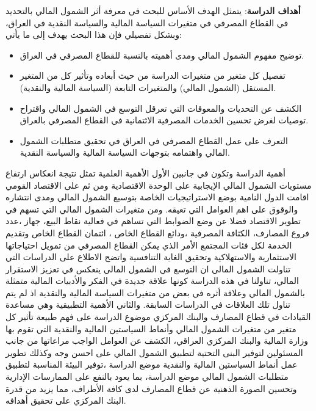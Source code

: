 \documentclass[10pt,a4paper]{report}
\begin{document}
\begin{doublespacing}
\textbf{أهداف الدراسة}: يتمثل الهدف الأساس للبحث في معرفة أثر الشمول المالي بالتحديد في القطاع المصرفي في متغيرات السياسة المالية والسياسة النقدية في العراق، وبشكل تفصيلي فإن هذا البحث يهدف إلى ما يأتي:
\begin{itemize}
	\item توضيح مفهوم الشمول المالي ومدى أهميته بالنسبة للقطاع المصرفي في العراق.
	\item تفصيل كل متغير من متغيرات الدراسة من حيث أبعاده وتأثير كل من المتغير المستقل (الشمول المالي) والمتغيرات التابعة (السياسة المالية والنقدية).
	\item الكشف عن التحديات والمعوقات التي تعرقل التوسع في الشمول المالي واقتراح توصيات لغرض تحسين الخدمات المصرفية الائتمانية في القطاع المصرفي بالعراق.
	\item التعرف على عمل القطاع المصرفي في العراق في تحقيق متطلبات الشمول المالي واهتمامه بتوجهات السياسة المالية والسياسة النقدية.
\end{itemize}

أهمية الدراسة وتكون في جانبين الأول الأهمية العلمية تمثل نتيجة انعكاس ارتفاع مستويات الشمول المالي الإيجابية على الوحدة الاقتصادية ومن ثم على الاقتصاد القومي اقامت الدول النامية بوضع الاستراتيجيات الخاصة بتوسيع الشمول المالي ومدى انتشاره والوقوق على اهم العوامل التي تعيقه. ومن متغيرات الشمول المالي التي تسهم في تطوير الاقتصاد فضلا عن وضع  الضوابط  التي تساهم في فعالية نقاط البيع، جهاز  ،عدد فروع المصارف، الكثافة المصرفية ،ودائع القطاع الخاص ، ائتمان القطاع الخاص وتقديم الخدمة لكل فئات المجتمع الأمر الذي يمكن القطاع المصرفي من تمويل احتياجاتها الاستثمارية والاستهلاكية وتحقيق الغاية التنافسية واتضح الاطلاع على الدراسات التي تناولت الشمول المالي ان التوسع في الشمول المالي ينعكس في تعزيز الاستقرار المالي، تناولنا في هذه الدراسة كونها علاقة جديدة في الفكر والأدبيات المالية متمثلة بالشمول المالي وعلاقة أثره في بعض من متغيرات السياسة المالية والنقدية اذ لم يتم تناول تلك العلاقات في الدراسات السابقة. والثاني الأهمية التطبيقية وهي مساعدة القيادات في قطاع المصارف والبنك المركزي موضوع الدراسة على فهم طبيعة تأثير كل متغير من متغيرات الشمول المالي وأنماط السياستين المالية والنقدية التي تقوم بها وزارة المالية والبنك المركزي العراقي، الكشف عن العوامل الواجب مراعاتها من جانب المسئولين لتوفير البنى التحتية لتطبيق الشمول المالي على احسن وجه وكذلك تطوير عمل أنماط السياستين المالية والنقدية موضع الدراسة ،توفير البيئة المناسبة لتطبيق متطلبات الشمول المالي  موضع الدراسة، بما يعود بالنفع على الممارسات الإدارية وتحسين الصورة الذهنية عن قطاع المصارف لدى كافة الأطراف، مما يزيد من قدرة البنك المركزي على تحقيق أهدافه.


\end{doublespacing}
\end{document}
